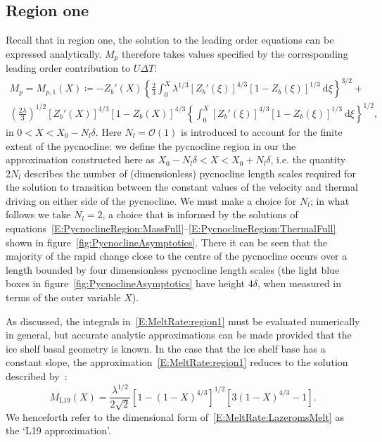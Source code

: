 \documentclass{jfm}
\newcommand{\order}[1]{\mathcal{O}(#1)}
\newcommand{\lt}{\delta} %
\begin{document}
\subsection{Region one}
Recall that in region one, the solution to the leading order equations can be expressed analytically. $M_p$ therefore takes values specified by the corresponding leading order contribution to $U\Delta T$:
\begin{multline}\label{E:MeltRate:region1}
M_{p} = M_{p,1}(X) \coloneqq - Z_b'(X)\left\{\frac{2}{3}\int_0^X \lambda^{1/3}\left[Z_b'(\xi)\right]^{4/3}\left[1 - Z_b(\xi)\right]^{1/3}~\mathrm{d}\xi\right\}^{3/2} + \\
\left(\frac{2\lambda}{3}\right)^{1/2}\left[Z_b'(X)\right]^{4/3}\left[1 - Z_b(X)\right]^{4/3} \left\{\int_0^X \left[Z_b'(\xi)\right]^{4/3}\left[1 - Z_b(\xi)\right]^{1/3}~\mathrm{d}\xi\right\}^{1/2},
\end{multline}
in $0 < X < X_0 - N_l \lt $. Here $N_l = \order{1}$ is introduced to account for the finite extent of the pycnocline: we define the pycnocline region in our the approximation constructed here as $X_0 - N_l \lt < X < X_0 + N_l \lt$, i.e. the quantity $2 N_l$ describes the number of (dimensionless) pycnocline length scales required for the solution to transition between the constant values of the velocity and thermal driving on either side of the pycnocline.  We must make a choice for $N_l$; in what follows we take $N_l = 2$, a choice that is informed by the solutions of equations~\eqref{E:PycnoclineRegion:MassFull}--\eqref{E:PycnoclineRegion:ThermalFull} shown in figure~\ref{fig:PycnoclineAsymptotics}. There it can be seen that the majority of the rapid change close to the centre of the pycnocline occurs over a length bounded by four dimensionless pycnocline length scales (the light blue boxes in figure~\ref{fig:PycnoclineAsymptotics} have height $4\lt$, when measured in terms of the outer variable $X$).

As discussed, the integrals in~\eqref{E:MeltRate:region1} must be evaluated numerically in general, but accurate analytic approximations can be made provided that the ice shelf basal geometry is known. In the case that the ice shelf base has a constant slope, the approximation~\eqref{E:MeltRate:region1} reduces to the solution described by~\cite{Lazeroms2019JPhysOcean}:
\begin{equation}\label{E:MeltRate:LazeromsMelt}
M_{\text{L19}}(X) = \frac{\lambda^{1/2}}{2\sqrt{2}}\left[1 - (1 - X)^{4/3}\right]^{1/2}\left[3(1-X)^{4/3} - 1\right].
\end{equation}
We henceforth refer to the dimensional form of~\eqref{E:MeltRate:LazeromsMelt} as the `L19 approximation'. 
\end{document}
